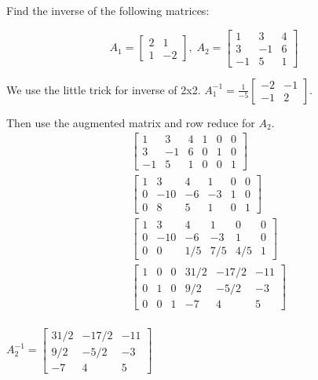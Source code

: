\documentclass[11pt]{article}
\begin{document}

Find the inverse of the following matrices:

$$
A_1 = \begin{bmatrix}
    2 & 1 \\ 1 & -2
\end{bmatrix}, \; A_2 = \begin{bmatrix}
    1 & 3 & 4 \\ 3 & -1 & 6 \\ -1 & 5 & 1
\end{bmatrix}
$$

\soln

We use the little trick for inverse of 2x2.
$A_1^{-1} = \frac{1}{-5} \begin{bmatrix}
    -2 & -1 \\ -1 & 2
\end{bmatrix}$.

Then use the augmented matrix and row reduce for $A_2$.
\begin{align*}
    &\begin{bmatrix}
        1 & 3 & 4 & 1 & 0 & 0 \\ 3 & -1 & 6 & 0 & 1 & 0\\ -1 & 5 & 1 & 0 & 0 & 1
    \end{bmatrix} \\
    &\begin{bmatrix}
        1 & 3 & 4 & 1 & 0 & 0 \\ 0 & -10 & -6 & -3 & 1 & 0\\ 0 & 8 & 5 & 1 & 0 & 1
    \end{bmatrix} \\
    &\begin{bmatrix}
        1 & 3 & 4 & 1 & 0 & 0 \\ 0 & -10 & -6 & -3 & 1 & 0\\ 0 & 0 & 1/5 & 7/5 & 4/5 & 1
    \end{bmatrix} \\
    &\begin{bmatrix}
        1 & 0 & 0 & 31/2 & -17/2 & -11 \\
        0 & 1 & 0 & 9/2 & -5/2 & -3 \\
        0 & 0 & 1 & -7 & 4 & 5
    \end{bmatrix} \\
\end{align*}

$A_2^{-1} = \begin{bmatrix}
    31/2 & -17/2 & -11 \\
9/2 & -5/2 & -3 \\
-7 & 4 & 5
\end{bmatrix}$
\end{document}
